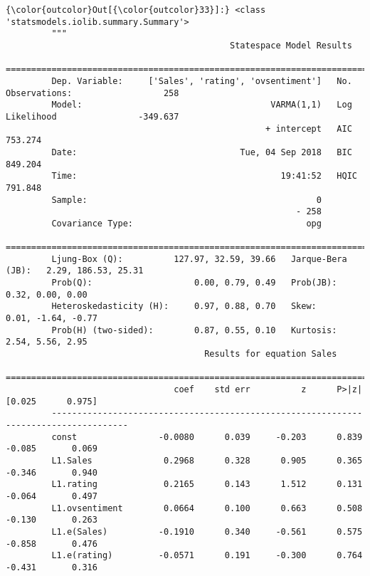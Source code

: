\documentclass[11pt]{article}
\begin{document}
\begin{Verbatim}[commandchars=\\\{\}]
{\color{outcolor}Out[{\color{outcolor}33}]:} <class 'statsmodels.iolib.summary.Summary'>
         """
                                            Statespace Model Results                                   
         ==============================================================================================
         Dep. Variable:     ['Sales', 'rating', 'ovsentiment']   No. Observations:                  258
         Model:                                     VARMA(1,1)   Log Likelihood                -349.637
                                                   + intercept   AIC                            753.274
         Date:                                Tue, 04 Sep 2018   BIC                            849.204
         Time:                                        19:41:52   HQIC                           791.848
         Sample:                                             0                                         
                                                         - 258                                         
         Covariance Type:                                  opg                                         
         ======================================================================================
         Ljung-Box (Q):          127.97, 32.59, 39.66   Jarque-Bera (JB):   2.29, 186.53, 25.31
         Prob(Q):                    0.00, 0.79, 0.49   Prob(JB):              0.32, 0.00, 0.00
         Heteroskedasticity (H):     0.97, 0.88, 0.70   Skew:                0.01, -1.64, -0.77
         Prob(H) (two-sided):        0.87, 0.55, 0.10   Kurtosis:              2.54, 5.56, 2.95
                                       Results for equation Sales                             
         =====================================================================================
                                 coef    std err          z      P>|z|      [0.025      0.975]
         -------------------------------------------------------------------------------------
         const                -0.0080      0.039     -0.203      0.839      -0.085       0.069
         L1.Sales              0.2968      0.328      0.905      0.365      -0.346       0.940
         L1.rating             0.2165      0.143      1.512      0.131      -0.064       0.497
         L1.ovsentiment        0.0664      0.100      0.663      0.508      -0.130       0.263
         L1.e(Sales)          -0.1910      0.340     -0.561      0.575      -0.858       0.476
         L1.e(rating)         -0.0571      0.191     -0.300      0.764      -0.431       0.316

\end{Verbatim}
\end{document}
